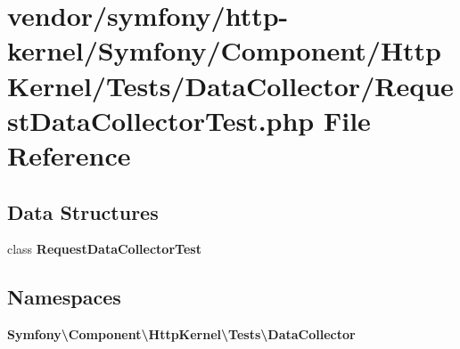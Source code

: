 \section{vendor/symfony/http-\/kernel/\+Symfony/\+Component/\+Http\+Kernel/\+Tests/\+Data\+Collector/\+Request\+Data\+Collector\+Test.php File Reference}
\label{_request_data_collector_test_8php}
\subsection*{Data Structures}
\begin{DoxyCompactItemize}
\item 
class {\bf Request\+Data\+Collector\+Test}
\end{DoxyCompactItemize}
\subsection*{Namespaces}
\begin{DoxyCompactItemize}
\item 
 {\bf Symfony\textbackslash{}\+Component\textbackslash{}\+Http\+Kernel\textbackslash{}\+Tests\textbackslash{}\+Data\+Collector}
\end{DoxyCompactItemize}
